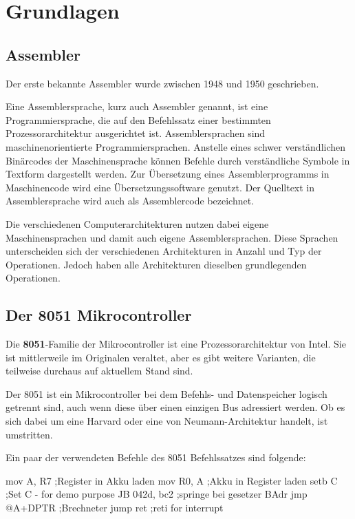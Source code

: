 \chapter{Grundlagen} 
\label{cha:Grundlagen}
 
 \section{Assembler} 
Der erste bekannte Assembler wurde zwischen 1948 und 1950 geschrieben.

Eine Assemblersprache, kurz auch Assembler genannt, ist eine Programmiersprache, die auf den Befehlssatz einer bestimmten Prozessorarchitektur ausgerichtet ist. Assemblersprachen  sind maschinenorientierte Programmiersprachen. Anstelle eines schwer verständlichen Binärcodes der Maschinensprache können Befehle durch verständliche Symbole in Textform dargestellt werden. Zur Übersetzung eines Assemblerprogramms in Maschinencode wird eine Übersetzungssoftware genutzt. Der Quelltext in Assemblersprache wird auch als Assemblercode bezeichnet.

Die verschiedenen Computerarchitekturen nutzen dabei eigene Maschinensprachen und damit auch eigene Assemblersprachen. Diese Sprachen unterscheiden sich der verschiedenen Architekturen in Anzahl und Typ der Operationen. Jedoch haben alle Architekturen dieselben grundlegenden Operationen. \cite{Assemblersprache}   
 
 \section{Der 8051 Mikrocontroller} 
 
 Die \textbf{8051}-Familie der Mikrocontroller ist eine Prozessorarchitektur von Intel. Sie ist mittlerweile im Originalen veraltet, aber es gibt weitere Varianten, die teilweise durchaus auf aktuellem Stand sind. 
 
 Der 8051 ist ein Mikrocontroller bei dem Befehls- und Datenspeicher logisch getrennt sind, auch wenn diese über einen einzigen Bus adressiert werden. Ob es sich dabei um eine Harvard oder eine von Neumann-Architektur handelt, ist umstritten.\cite{8051}
 
Ein paar der verwendeten Befehle des 8051 Befehlssatzes sind folgende: 
 
 \begin{GenericCode}
 mov A, R7	;Register in Akku laden
 mov R0, A	;Akku in Register laden
 setb C		;Set C - for demo purpose	
 JB 042d, bc2	;springe bei gesetzer BAdr
 jmp @A+DPTR	;Brechneter jump
 ret		;reti for interrupt
 	
 \end{GenericCode}
 \cite{Befehlssatz}
 
